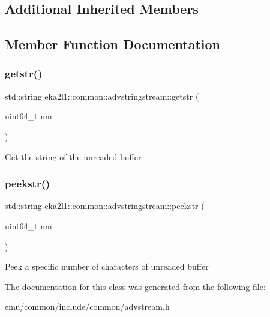 \subsection*{Additional Inherited Members}


\subsection{Member Function Documentation}
\mbox{\label{classeka2l1_1_1common_1_1advstringstream_af07742f27d9343fb4c88946a4e408727}} 
\subsubsection{\texorpdfstring{getstr()}{getstr()}}
{\footnotesize\ttfamily std\+::string eka2l1\+::common\+::advstringstream\+::getstr (\begin{DoxyParamCaption}\item[{uint64\+\_\+t}]{nm }\end{DoxyParamCaption})\hspace{0.3cm}{\ttfamily [inline]}}

Get the string of the unreaded buffer \mbox{\label{classeka2l1_1_1common_1_1advstringstream_a95581d4a188ebfcb50df49d43a62d650}} 
\subsubsection{\texorpdfstring{peekstr()}{peekstr()}}
{\footnotesize\ttfamily std\+::string eka2l1\+::common\+::advstringstream\+::peekstr (\begin{DoxyParamCaption}\item[{uint64\+\_\+t}]{nm }\end{DoxyParamCaption})\hspace{0.3cm}{\ttfamily [inline]}}

Peek a specific number of characters of unreaded buffer 

The documentation for this class was generated from the following file\+:\begin{DoxyCompactItemize}
\item 
emu/common/include/common/advstream.\+h\end{DoxyCompactItemize}
